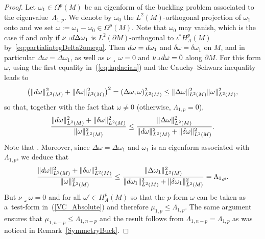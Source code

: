 \documentclass[10pt,a4paper]{amsart}
\begin{document}
\begin{proof} Let $\omega_1\in\Omega^p(M)$ be an eigenform of the buckling problem associated to the eigenvalue~$\Lambda_{1,p}$.
We denote by $\omega_0$ the $L^2(M)$-orthogonal projection of $\omega_1$ onto  and we set $\omega:=\omega_1-\omega_0\in \Omega^p(M)$.
Note that $\omega_0$ may vanish, which is the case if and only if $\nu\lrcorner\,{\rm d}\Delta\omega_1$ is $L^2(\partial M)$-orthogonal to $\iota^*H_A^p(M)$ by~\eqref{eq:partialintegDelta2omega}.
Then ${\rm d}\omega={\rm d}\omega_1$ and $\delta\omega=\delta\omega_1$ on $M$, and in particular $\Delta\omega=\Delta\omega_1$, as well as $\nu\lrcorner\,\omega=0$ and $\nu\lrcorner\,{\rm d}\omega=0$ along $\partial M$.
For this form $\omega$, using the first equality in~(\ref{eq:laplacian}) and the Cauchy--Schwarz inequality leads to
\begin{gather*}
\bigl(\|{\rm d}\omega\|_{L^2(M)}^2+\|\delta\omega\|_{L^2(M)}^2\bigr)^2 = (\Delta\omega,\omega )_{L^2(M)}^2 \leq \|\Delta\omega\|_{L^2(M)}^2 \|\omega\|_{L^2(M)}^2,
\end{gather*}
so that, together with the fact that $\omega\neq0$ (otherwise, $\Lambda_{1,p}=0$),
\[
\frac{\|{\rm d}\omega\|_{L^2(M)}^2+\|\delta\omega\|_{L^2(M)}^2}{\|\omega\|_{L^2(M)}^2}\leq\frac{\|\Delta\omega\|_{L^2(M)}^2}{\|{\rm d}\omega\|_{L^2(M)}^2+\|\delta\omega\|_{L^2(M)}^2}.
\]
Note that .
Moreover, since $\Delta\omega=\Delta\omega_1$ and $\omega_1$ is an eigenform associated with $\Lambda_{1,p}$, we deduce that
\[
\frac{\|{\rm d}\omega\|_{L^2(M)}^2+\|\delta\omega\|_{L^2(M)}^2}{\|\omega\|_{L^2(M)}^2}\leq\frac{\|\Delta\omega_1\|_{L^2(M)}^2}{\|{\rm d}\omega_1\|_{L^2(M)}^2+\|\delta\omega_1\|_{L^2(M)}^2}=\Lambda_{1,p}.
\]
But $\nu\lrcorner\omega=0$ and  for all $\omega'\in H_A^p(M)$ so that the $p$-form $\omega$ can be taken as a~test-form in~(\ref{VC_Absolute}) and therefore $\displaystyle\mu_{1,p}\leq \Lambda_{1,p}$.
The same argument ensures that $\mu_{1,n-p}\leq\Lambda_{1,n-p}$ and the result follows from $\Lambda_{1,n-p}=\Lambda_{1,p}$ as was noticed in Remark~\ref{SymmetryBuck}.


\end{proof}
\end{document}
